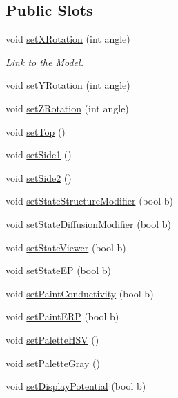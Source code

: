 \subsection*{Public Slots}
\begin{DoxyCompactItemize}
\item 
void \hyperlink{classgl_atrium_aa5afd6c2c43a3b9445e6821586671c36}{set\+X\+Rotation} (int angle)
\begin{DoxyCompactList}\small\item\em Link to the Model. \end{DoxyCompactList}\item 
void \hyperlink{classgl_atrium_a4b339e5080f2019dec3e916b4348f41c}{set\+Y\+Rotation} (int angle)
\item 
void \hyperlink{classgl_atrium_aab5b1212e320c13d3d3f30425f8e2028}{set\+Z\+Rotation} (int angle)
\item 
void \hyperlink{classgl_atrium_adb2aa7af154e4d83ca976bd7042726aa}{set\+Top} ()
\item 
void \hyperlink{classgl_atrium_a1ea5edb0605ee17d77d636c81dbc74a9}{set\+Side1} ()
\item 
void \hyperlink{classgl_atrium_aab139e009363e2a027e4f3a5e3f1e84b}{set\+Side2} ()
\item 
void \hyperlink{classgl_atrium_a10acfe771a3112264051aaecd87bc4d6}{set\+State\+Structure\+Modifier} (bool b)
\item 
void \hyperlink{classgl_atrium_a4712eeb59127c712ca5ed3e9ea2363d6}{set\+State\+Diffusion\+Modifier} (bool b)
\item 
void \hyperlink{classgl_atrium_a4fdc27d1e3a4b46fb4e545b5d5452656}{set\+State\+Viewer} (bool b)
\item 
void \hyperlink{classgl_atrium_a1bc8825c11be22bef34d80d8e92bba1d}{set\+State\+E\+P} (bool b)
\item 
void \hyperlink{classgl_atrium_a6c943af88177755f0dac95d12767cd22}{set\+Paint\+Conductivity} (bool b)
\item 
void \hyperlink{classgl_atrium_a4deff8ebaa4b5042643cbd1acefa7128}{set\+Paint\+E\+R\+P} (bool b)
\item 
void \hyperlink{classgl_atrium_a5a67ffc011f4545b7ecf4d8a745a6c06}{set\+Palette\+H\+S\+V} ()
\item 
void \hyperlink{classgl_atrium_acf6258aaf1d7c1a8cd7afe558bfd8fa4}{set\+Palette\+Gray} ()
\item 
void \hyperlink{classgl_atrium_a41253a382f5aa16fd076770782672661}{set\+Display\+Potential} (bool b)
\item 

\end{DoxyCompactItemize}
